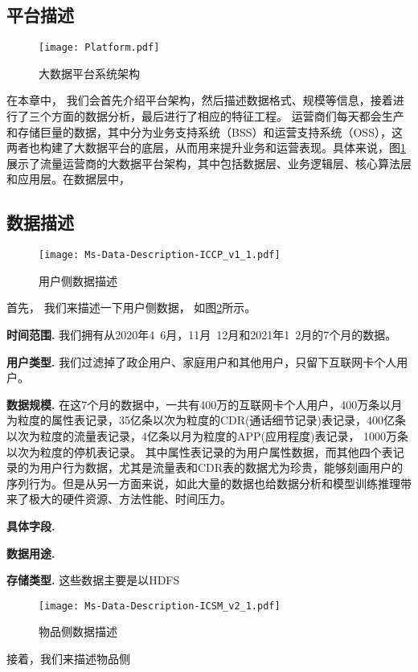 \subsection{平台描述}
\begin{figure}[hbt]
	\centering
	\texttt{[image: Platform.pdf]}
	\caption{大数据平台系统架构}
	\label{Fig:Data_Platform}
\end{figure}
在本章中， 我们会首先介绍平台架构，然后描述数据格式、规模等信息，接着进行了三个方面的数据分析，最后进行了相应的特征工程。
运营商们每天都会生产和存储巨量的数据，其中分为业务支持系统（BSS）和运营支持系统（OSS），这两者也构建了大数据平台的底层，从而用来提升业务和运营表现。具体来说，图\ref{Fig:Data_Platform}展示了流量运营商的大数据平台架构，其中包括数据层、业务逻辑层、核心算法层和应用层。在数据层中， 

\subsection{数据描述}
\begin{figure}[hbt]
	\centering
	\texttt{[image: Ms-Data-Description-ICCP\_v1\_1.pdf]}
	\caption{用户侧数据描述}
	\label{Fig:User-Side-Data}
\end{figure}
首先， 我们来描述一下用户侧数据， 如图\ref{Fig:User-Side-Data}所示。\par
\textbf{时间范围.} 我们拥有从2020年4~6月，11月~12月和2021年1~2月的7个月的数据。\par
\textbf{用户类型.} 我们过滤掉了政企用户、家庭用户和其他用户，只留下互联网卡个人用户。\par
\textbf{数据规模.} 在这7个月的数据中，一共有400万的互联网卡个人用户，400万条以月为粒度的属性表记录，35亿条以次为粒度的CDR(通话细节记录)表记录，400亿条以次为粒度的流量表记录，4亿条以月为粒度的APP(应用程度)表记录， 1000万条以次为粒度的停机表记录。
其中属性表记录的为用户属性数据，而其他四个表记录的为用户行为数据，尤其是流量表和CDR表的数据尤为珍贵，能够刻画用户的序列行为。但是从另一方面来说，如此大量的数据也给数据分析和模型训练推理带来了极大的硬件资源、方法性能、时间压力。\par
\textbf{具体字段.}\par
\textbf{数据用途.} \par
\textbf{存储类型.} 这些数据主要是以HDFS\par

\begin{figure}[hbt]
	\centering
	\texttt{[image: Ms-Data-Description-ICSM\_v2\_1.pdf]}
	\caption{物品侧数据描述}
	\label{Fig:Item-Side-Data}
\end{figure}
接着，我们来描述物品侧



